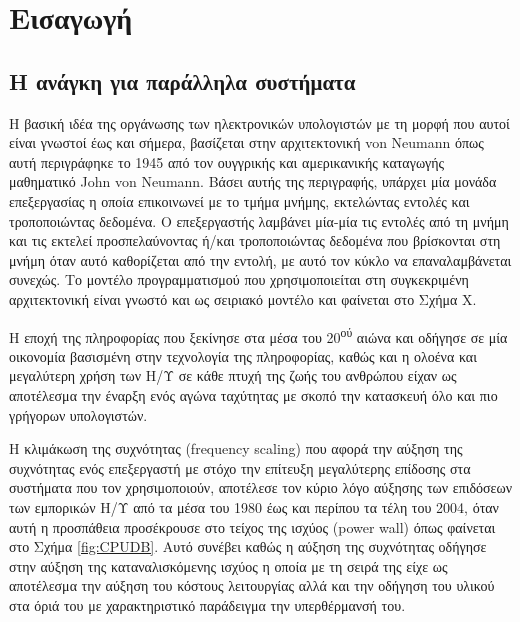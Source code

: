 \chapter{Εισαγωγή}
\label{ch:Introduction}

\section{Η ανάγκη για παράλληλα συστήματα} %
\label{sec:The need for parallel systems}
Η βασική ιδέα της οργάνωσης των ηλεκτρονικών υπολογιστών με τη μορφή που αυτοί είναι γνωστοί έως και σήμερα, βασίζεται στην αρχιτεκτονική von Neumann όπως αυτή περιγράφηκε το 1945 από τον ουγγρικής και αμερικανικής καταγωγής μαθηματικό John von Neumann. Βάσει αυτής της περιγραφής, υπάρχει μία μονάδα επεξεργασίας η οποία επικοινωνεί με το τμήμα μνήμης, εκτελώντας εντολές και τροποποιώντας δεδομένα. Ο επεξεργαστής λαμβάνει μία-μία τις εντολές από τη μνήμη και τις εκτελεί προσπελαύνοντας ή/και τροποποιώντας δεδομένα που βρίσκονται στη μνήμη όταν αυτό καθορίζεται από την εντολή, με αυτό τον κύκλο να επαναλαμβάνεται συνεχώς. Το μοντέλο προγραμματισμού που χρησιμοποιείται στη συγκεκριμένη αρχιτεκτονική είναι γνωστό και ως σειριακό μοντέλο και φαίνεται στο Σχήμα X.

Η εποχή της πληροφορίας που ξεκίνησε στα μέσα του 20\textsuperscript{ού} αιώνα και οδήγησε σε μία οικονομία βασισμένη στην τεχνολογία της πληροφορίας, καθώς και η ολοένα και μεγαλύτερη χρήση των Η/Υ σε κάθε πτυχή της ζωής του ανθρώπου είχαν ως αποτέλεσμα την έναρξη ενός αγώνα ταχύτητας με σκοπό την κατασκευή όλο και πιο γρήγορων υπολογιστών.

Η κλιμάκωση της συχνότητας (frequency scaling) που αφορά την αύξηση της συχνότητας ενός επεξεργαστή με στόχο την επίτευξη μεγαλύτερης επίδοσης στα συστήματα που τον χρησιμοποιούν, αποτέλεσε τον κύριο λόγο αύξησης των επιδόσεων των εμπορικών Η/Υ από τα μέσα του 1980 έως και περίπου τα τέλη του 2004, όταν αυτή η προσπάθεια προσέκρουσε στο τείχος της ισχύος (power wall) όπως φαίνεται στο Σχήμα \ref{fig:CPUDB}. Αυτό συνέβει καθώς η αύξηση της συχνότητας οδήγησε στην αύξηση της καταναλισκόμενης ισχύος η οποία με τη σειρά της είχε ως αποτέλεσμα την αύξηση του κόστους λειτουργίας αλλά και την οδήγηση του υλικού στα όριά του με χαρακτηριστικό παράδειγμα την υπερθέρμανσή του.

